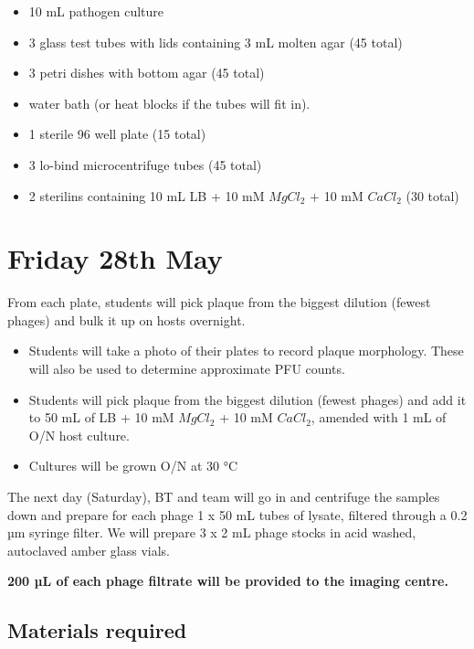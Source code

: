 \documentclass[
]{book}
\providecommand{\tightlist}{%
  \setlength{\itemsep}{0pt}\setlength{\parskip}{0pt}}
\begin{document}
\begin{itemize}
\tightlist
\item
  10 mL pathogen culture
\item
  3 glass test tubes with lids containing 3 mL molten agar (45 total)
\item
  3 petri dishes with bottom agar (45 total)
\item
  water bath (or heat blocks if the tubes will fit in).
\item
  1 sterile 96 well plate (15 total)
\item
  3 lo-bind microcentrifuge tubes (45 total)
\item
  2 sterilins containing 10 mL LB + 10 mM \(MgCl_{2}\) + 10 mM \(CaCl_{2}\) (30 total)
\end{itemize}

\hypertarget{friday-28th-may}{%
\section{Friday 28th May}\label{friday-28th-may}}

From each plate, students will pick plaque from the biggest dilution (fewest phages) and bulk it up on hosts overnight.

\begin{itemize}
\tightlist
\item
  Students will take a photo of their plates to record plaque morphology. These will also be used to determine approximate PFU counts.
\item
  Students will pick plaque from the biggest dilution (fewest phages) and add it to 50 mL of LB + 10 mM \(MgCl_{2}\) + 10 mM \(CaCl_{2}\), amended with 1 mL of O/N host culture.
\item
  Cultures will be grown O/N at 30 °C
\end{itemize}

The next day (Saturday), BT and team will go in and centrifuge the samples down and prepare for each phage 1 x 50 mL tubes of lysate, filtered through a 0.2 µm syringe filter. We will prepare 3 x 2 mL phage stocks in acid washed, autoclaved amber glass vials.

\textbf{200 µL of each phage filtrate will be provided to the imaging centre.}

\hypertarget{materials-required-4}{%
\subsection{Materials required}\label{materials-required-4}}
\end{document}
